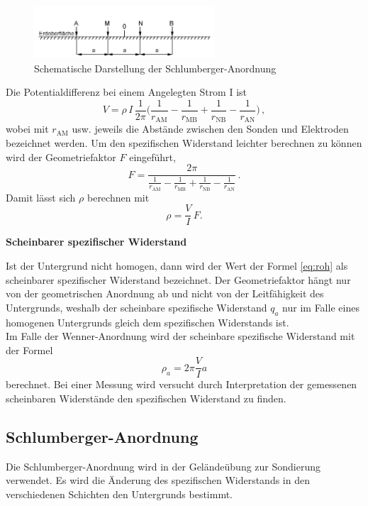 \documentclass[a4paper,12pt]{scrartcl}
\begin{document}
\begin{figure}[h]
\centering
\includegraphics[width=0.6\textwidth]{Wenner.png}
\caption{Schematische Darstellung der Schlumberger-Anordnung}
\label{abb:Wenner}
\end{figure}
Die Potentialdifferenz bei einem Angelegten Strom I ist
\begin{equation}
V = \rho \, I \, \frac{1}{2 \pi} \big(\frac{1}{r_{\mathrm{AM}}} - \frac{1}{r_{\mathrm{MB}}} + \frac{1}{r_{\mathrm{NB}}} - \frac{1}{r_{\mathrm{AN}}} \big) \, ,
\end{equation}
wobei mit $r_{\mathrm{AM}}$ usw. jeweils die Abstände zwischen den Sonden und Elektroden bezeichnet werden.
Um den spezifischen Widerstand leichter berechnen zu können wird der Geometriefaktor $F$ eingeführt,
$$F = \frac{2 \pi}{\frac{1}{r_{\mathrm{AM}}} - \frac{1}{r_{\mathrm{MB}}} + \frac{1}{r_{\mathrm{NB}}} - \frac{1}{r_{\mathrm{AN}}}}\,.$$
Damit lässt sich $\rho$ berechnen mit 
\begin{equation}
\rho = \frac{V}{I} \, F.
\end{equation} \label{eq:roh}

\textbf{Scheinbarer spezifischer Widerstand}

Ist der Untergrund nicht homogen, dann wird der Wert der Formel \ref{eq:roh} als scheinbarer spezifischer Widerstand bezeichnet. Der Geometriefaktor hängt nur von der geometrischen Anordnung ab und nicht von der 
Leitfähigkeit des Untergrunds, weshalb der scheinbare spezifische Widerstand $q_a$ nur im Falle eines homogenen Untergrunds gleich dem spezifischen Widerstands ist.\\
Im Falle der Wenner-Anordnung wird  der scheinbare spezifische Widerstand mit der Formel
$$ \rho_a = 2 \pi \frac{V}{I} a $$
berechnet.
Bei einer Messung wird versucht durch Interpretation der gemessenen scheinbaren Widerstände den spezifischen Widerstand zu finden.

\subsection{Schlumberger-Anordnung}
Die Schlumberger-Anordnung wird in der Geländeübung zur Sondierung verwendet. Es wird die Änderung des spezifischen Widerstands in den verschiedenen Schichten den Untergrunds bestimmt.
\end{document}
